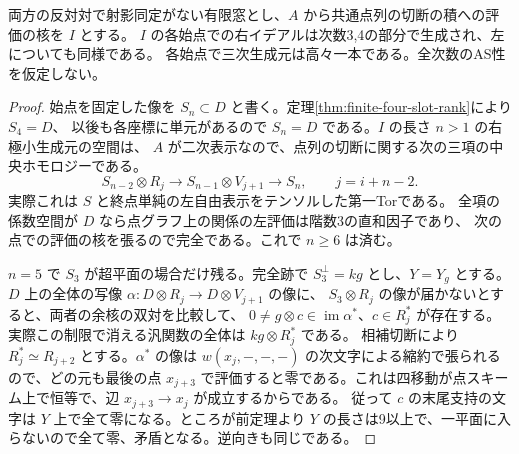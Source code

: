 \begin{corollary}\label{cor:finite-asymmetric-point-ideal}
両方の反対対で射影同定がない有限窓とし、$A$ から共通点列の切断の積への評価の核を $I$ とする。
$I$ の各始点での右イデアルは次数3,4の部分で生成され、左についても同様である。
各始点で三次生成元は高々一本である。全次数のAS性を仮定しない。
\end{corollary}
\begin{proof}
始点を固定した像を $S_n\subset D$ と書く。定理\ref{thm:finite-four-slot-rank}により $S_4=D$、
以後も各座標に単元があるので $S_n=D$ である。$I$ の長さ $n>1$ の右極小生成元の空間は、
$A$ が二次表示なので、点列の切断に関する次の三項の中央ホモロジーである。
\[
 S_{n-2}\otimes R_j\longrightarrow S_{n-1}\otimes V_{j+1}\longrightarrow S_n ,
 \qquad j=i+n-2 .
\]
実際これは $S$ と終点単純の左自由表示をテンソルした第一Torである。
全項の係数空間が $D$ なら点グラフ上の関係の左評価は階数3の直和因子であり、
次の点での評価の核を張るので完全である。これで $n\ge6$ は済む。

$n=5$ で $S_3$ が超平面の場合だけ残る。完全跡で $S_3^\perp=kg$ とし、$Y=Y_g$ とする。
$D$ 上の全体の写像 $\alpha:D\otimes R_j\to D\otimes V_{j+1}$ の像に、
$S_3\otimes R_j$ の像が届かないとすると、両者の余核の双対を比較して、
$0\ne g\otimes c\in\operatorname{im}\alpha^*$、$c\in R_j^*$ が存在する。
実際この制限で消える汎関数の全体は $kg\otimes R_j^*$ である。
相補切断により $R_j^*\simeq R_{j+2}$ とする。$\alpha^*$ の像は
$w(x_j,-,-,-)$ の次文字による縮約で張られるので、どの元も最後の点 $x_{j+3}$
で評価すると零である。これは四移動が点スキーム上で恒等で、辺 $x_{j+3}\to x_j$ が成立するからである。
従って $c$ の末尾支持の文字は $Y$ 上で全て零になる。ところが前定理より
$Y$ の長さは9以上で、一平面に入らないので全て零、矛盾となる。逆向きも同じである。
\end{proof}

